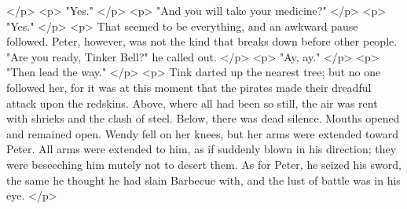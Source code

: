     </p>
    <p>
      "Yes."
    </p>
    <p>
      "And you will take your medicine?"
    </p>
    <p>
      "Yes."
    </p>
    <p>
      That seemed to be everything, and an awkward pause followed. Peter,
      however, was not the kind that breaks down before other people. "Are you
      ready, Tinker Bell?" he called out.
    </p>
    <p>
      "Ay, ay."
    </p>
    <p>
      "Then lead the way."
    </p>
    <p>
      Tink darted up the nearest tree; but no one followed her, for it was at
      this moment that the pirates made their dreadful attack upon the redskins.
      Above, where all had been so still, the air was rent with shrieks and the
      clash of steel. Below, there was dead silence. Mouths opened and remained
      open. Wendy fell on her knees, but her arms were extended toward Peter.
      All arms were extended to him, as if suddenly blown in his direction; they
      were beseeching him mutely not to desert them. As for Peter, he seized his
      sword, the same he thought he had slain Barbecue with, and the lust of
      battle was in his eye.
    </p>
